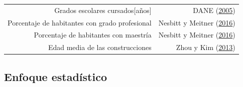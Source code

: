 \documentclass[12pt,a4paper,openany]{book}
\theoremstyle{definition}
\theoremstyle{definition}
\theoremstyle{definition}
\theoremstyle{remark}
\begin{document}
\begin{longtable}[]{@{}rr@{}}
\begin{minipage}[t]{0.57\columnwidth}
Grados escolares cursados{[}años{]}\strut
\end{minipage} & \begin{minipage}[t]{0.31\columnwidth}\raggedleft\strut
DANE (\protect\hyperlink{ref-censo_sistema_dane}{2005})\strut
\end{minipage}\tabularnewline
\begin{minipage}[t]{0.57\columnwidth}\raggedleft\strut
Porcentaje de habitantes con grado profesional\strut
\end{minipage} & \begin{minipage}[t]{0.31\columnwidth}\raggedleft\strut
Nesbitt y Meitner
(\protect\hyperlink{ref-nesbitt_exploring_2016}{2016})\strut
\end{minipage}\tabularnewline
\begin{minipage}[t]{0.57\columnwidth}\raggedleft\strut
Porcentaje de habitantes con maestría\strut
\end{minipage} & \begin{minipage}[t]{0.31\columnwidth}\raggedleft\strut
Nesbitt y Meitner
(\protect\hyperlink{ref-nesbitt_exploring_2016}{2016})\strut
\end{minipage}\tabularnewline
\begin{minipage}[t]{0.57\columnwidth}\raggedleft\strut
Edad media de las construcciones\strut
\end{minipage} & \begin{minipage}[t]{0.31\columnwidth}\raggedleft\strut
Zhou y Kim (\protect\hyperlink{ref-zhou_social_2013}{2013})\strut
\end{minipage}\tabularnewline
\bottomrule
\end{longtable}

\subsection{Enfoque estadístico}\label{enfoque-estaduxedstico}
\end{document}
